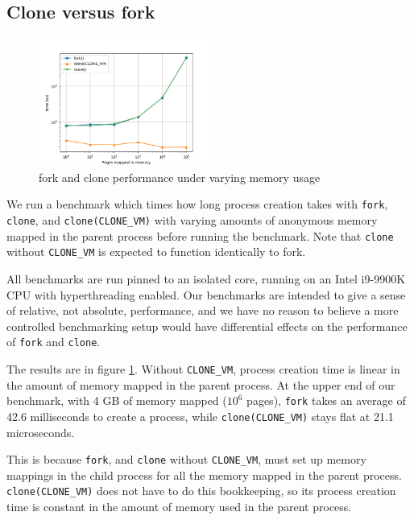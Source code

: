 \documentclass[letterpaper,twocolumn,10pt]{article}
\begin{document}
\subsection{Clone versus fork}\label{microbench}
\begin{figure}[h!]
\centering
 \includegraphics[width=0.5\textwidth]{microbench}
 \caption{fork and clone performance under varying memory usage}
 \label{fig:microbench}
\end{figure}

We run a benchmark which times how long process creation takes
with \texttt{fork}, \texttt{clone}, and \verb|clone(CLONE_VM)|
with varying amounts of anonymous memory mapped in the parent process
before running the benchmark.
Note that \texttt{clone} without \verb|CLONE_VM| is expected to function identically to fork.

All benchmarks are run pinned to an isolated core,
running on an Intel i9-9900K CPU with hyperthreading enabled.
Our benchmarks are intended to give a sense of relative, not absolute, performance,
and we have no reason to believe a more controlled benchmarking setup
would have differential effects on the performance of \texttt{fork} and \texttt{clone}.

The results are in figure \ref{fig:microbench}.
Without \verb|CLONE_VM|,
process creation time is linear in the amount of memory mapped in the parent process.
At the upper end of our benchmark, with 4 GB of memory mapped ($10^6$ pages),
\texttt{fork} takes an average of 42.6 milliseconds to create a process,
while \verb|clone(CLONE_VM)| stays flat at 21.1 microseconds.

This is because \texttt{fork}, and \texttt{clone} without \verb|CLONE_VM|,
must set up memory mappings in the child process for all the memory mapped in the parent process.
\verb|clone(CLONE_VM)| does not have to do this bookkeeping,
so its process creation time is constant in the amount of memory used in the parent process.
\end{document}
